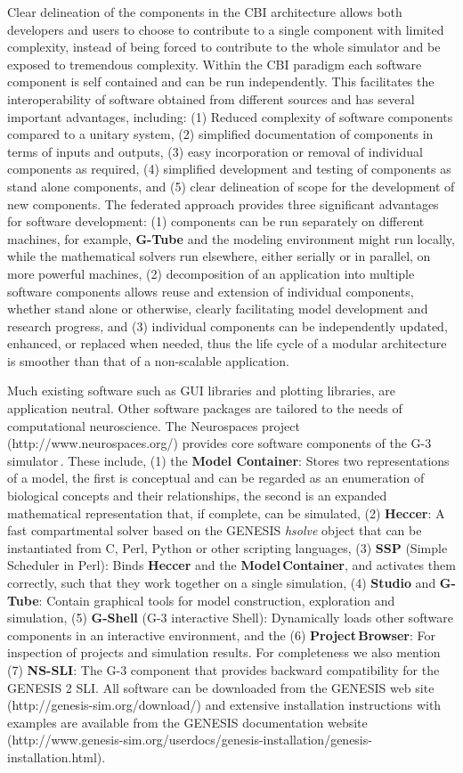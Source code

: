 \documentclass[12pt]{article}
\begin{document}
Clear delineation of the components in the CBI architecture allows both
developers and users to choose to contribute to a single component
with limited complexity, instead of being forced to contribute to the
whole simulator and be exposed to tremendous complexity. Within the
CBI paradigm each software component is self contained and can be run independently. This facilitates the
interoperability of software obtained from different sources and has
several important advantages, including: (1) Reduced complexity of
software components compared to a unitary system, (2) simplified
documentation of components in terms of inputs and outputs, (3) easy
incorporation or removal of individual components as required, (4)
simplified development and testing of components as stand alone
components, and (5) clear delineation of scope for the development of new
components. The federated approach provides three significant advantages
for software development: (1) components can be run separately on
different machines, for example, {\bf G-Tube} and the modeling environment
might run locally, while the mathematical solvers run elsewhere, either serially
or in parallel, on more powerful machines, (2) decomposition of an
application into multiple software components allows reuse and
extension of individual components, whether stand alone or otherwise,
clearly facilitating model development and research progress, and (3)
individual components can be independently updated, enhanced, or
replaced when needed, thus the life cycle of a modular architecture is
smoother than that of a non-scalable application.

Much existing software such as GUI libraries and plotting libraries,
are application neutral.  Other software packages are tailored to the
needs of computational neuroscience.  The Neurospaces project
(http://www.neurospaces.org/) provides core software components of the
G-3 simulator\,\cite{cornelis03:_neuros}. These include, (1) the {\bf
  Model Container}: Stores two representations of a model, the first
is conceptual and can be regarded as an enumeration of biological
concepts and their relationships, the second is an expanded
mathematical representation that, if complete, can be simulated, (2)
{\bf Heccer}: A fast compartmental solver based on the GENESIS {\it
  hsolve} object that can be instantiated from C, Perl, Python or
other scripting languages, (3) {\bf SSP} (Simple Scheduler in Perl):
Binds {\bf Heccer} and the {\bf Model\,Container}, and activates them
correctly, such that they work together on a single simulation, (4)
{\bf Studio} and {\bf G-Tube}: Contain graphical tools for model
construction, exploration and simulation, (5) {\bf G-Shell} (G-3
interactive Shell): Dynamically loads other software components in an
interactive environment, and the (6) {\bf Project\,Browser}: For
inspection of projects and simulation results. For completeness we
also mention (7) {\bf NS-SLI}: The G-3 component that provides
backward compatibility for the GENESIS 2 SLI. All software can be
downloaded from the GENESIS web site
(http://genesis-sim.org/download/) and extensive installation
instructions with examples are available from the GENESIS
documentation website
(http://www.genesis-sim.org/userdocs/genesis-installation/genesis-installation.html).
\end{document}
